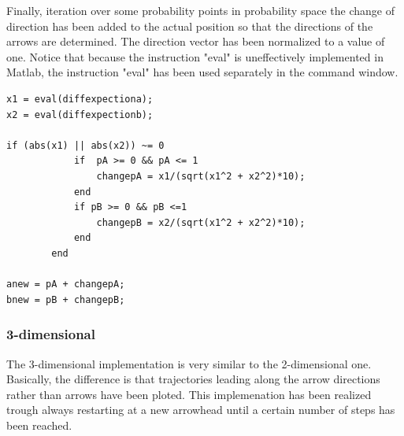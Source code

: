 \documentclass[11pt]{article}
\begin{document}
Finally, iteration over some probability points in probability space the change of direction has been added to the actual position so that the directions of the arrows are determined. The direction vector has been normalized to a value of one. Notice that because the instruction "eval" is uneffectively implemented in Matlab, the instruction "eval" has been used separately in the command window.

\begin{verbatim}
x1 = eval(diffexpectiona); 
x2 = eval(diffexpectionb);

if (abs(x1) || abs(x2)) ~= 0
            if  pA >= 0 && pA <= 1
                changepA = x1/(sqrt(x1^2 + x2^2)*10);
            end
            if pB >= 0 && pB <=1
                changepB = x2/(sqrt(x1^2 + x2^2)*10);
            end
        end

anew = pA + changepA;
bnew = pB + changepB;

\end{verbatim}

\subsubsection{3-dimensional}

The 3-dimensional implementation is very similar to the 2-dimensional one. Basically, the difference is that trajectories leading along the arrow directions rather than arrows have been ploted. This implemenation has been realized trough always restarting at a new arrowhead until a certain number of steps has been reached.
\end{document}
